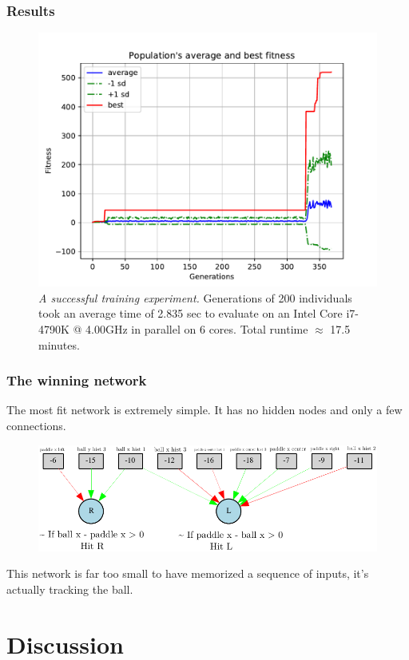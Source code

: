 \documentclass[t,pdflatex]{beamer}
\begin{document}
    \begin{frame}

        \frametitle{Results}
        \begin{figure}[h!]
            \centering
            \includegraphics[width=.7 \textwidth]{avg_fitness.pdf}
            \caption{\textit{A successful training experiment.} 
                Generations of 200 individuals took an average time of 2.835 sec to evaluate on an
                Intel Core i7-4790K @ 4.00GHz in parallel on 6 cores. Total runtime $\approx$ 17.5 minutes.}
        \end{figure}

    \end{frame}

    \begin{frame}
        \frametitle{The winning network}
        The most fit network is extremely simple.
        It has no hidden nodes and only a few connections.
        \begin{figure}[h!]
            \centering
            \includegraphics[width=1\textwidth]{winner_net_graph_annotated.pdf}
       \end{figure}
       This network is far too small to have memorized a sequence of inputs, it's actually tracking the ball.
    \end{frame}

\section{Discussion}
\end{document}
